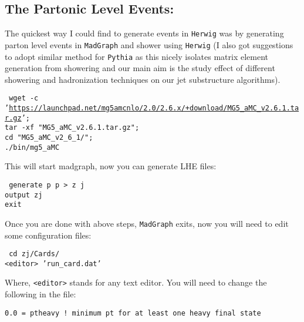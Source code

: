 \subsection{The Partonic Level Events:}
The quickest way I could find to generate events in {\tt Herwig} was by generating parton level events in {\tt MadGraph} and shower using {\tt Herwig} (I also got suggestions to adopt similar method for {\tt Pythia} as this nicely isolates matrix element generation from showering and our main aim is the study effect of different showering and hadronization techniques on our jet substructure algorithms).
\begin{center}
    \begin{minipage}{0.7\textwidth}
        { \tt
            wget -c '\url{https://launchpad.net/mg5amcnlo/2.0/2.6.x/+download/MG5_aMC_v2.6.1.tar.gz}';\\
            tar -xf "MG5\_aMC\_v2.6.1.tar.gz";\\
            cd "MG5\_aMC\_v2\_6\_1/";\\
            ./bin/mg5\_aMC
        }
    \end{minipage}
\end{center}
This will start madgraph, now you can generate LHE files:
\begin{center}
    \begin{minipage}{0.7\textwidth}
        {\tt
            generate p p > z j\\
            output zj\\
            exit
        }
    \end{minipage}
\end{center}
Once you are done with above steps, {\tt MadGraph} exits, now you will need to edit some configuration files:
\begin{center}
    \begin{minipage}{0.7\textwidth}
        {\tt
            cd zj/Cards/\\
            <editor> 'run\_card.dat'\\
        }
    \end{minipage}
\end{center}
Where, {\tt <editor>} stands for any text editor. You will need to change the following in the file:
\begin{center}
    \begin{minipage}{0.7\textwidth}
        {\tt 0.0  = ptheavy   ! minimum pt for at least one heavy final state}
    \end{minipage}
\end{center}
